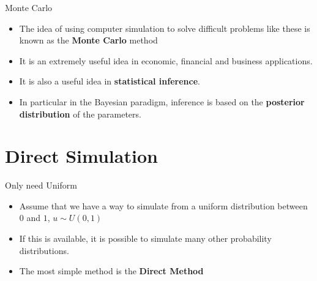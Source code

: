 \documentclass
[handout]
{beamer}
\begin{document}
\begin{frame}{Monte Carlo}
\begin{itemize}
\item The idea of using computer simulation to solve difficult problems like these is known as the {\bf Monte Carlo} method
\pause
\item It is an extremely useful idea in economic, financial and business applications.
\pause
\item It is also a useful idea in {\bf statistical inference}.
\pause
\item In particular in the Bayesian paradigm, inference is based on the {\bf posterior distribution} of the parameters.
\end{itemize}
\end{frame}
\section{Direct Simulation}
\begin{frame}{Only need Uniform}
\begin{itemize}
\item Assume that we have a way to simulate from a uniform distribution between $0$ and $1$, $u\sim U(0,1)$ 
\pause
\item If this is available, it is possible to simulate many other probability distributions.
\pause
\item The most simple method is the {\bf Direct Method}
\end{itemize}
\end{frame}
\end{document}

